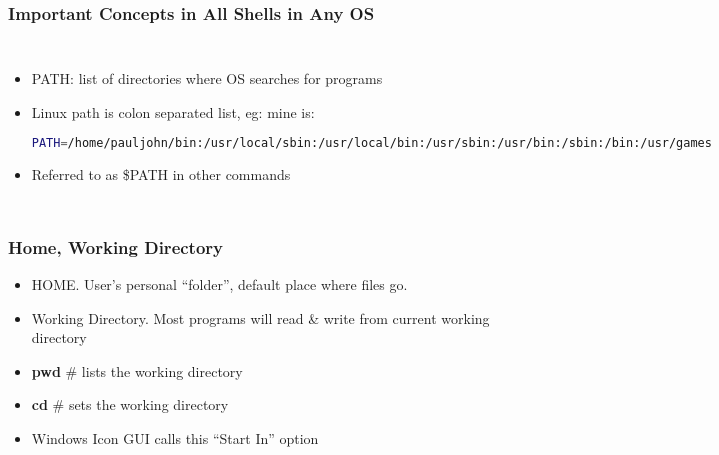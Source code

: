 \documentclass[English]{beamer}
\begin{document}
\begin{frame}[containsverbatim]
  \frametitle{Important Concepts in All Shells in Any OS}
  \begin{columns}
    \column{5cm}
    \begin{itemize}
    \item PATH: list of directories where OS searches for programs
   
    \item Linux path is colon separated list, eg: mine is:

\begin{lstlisting}[basicstyle={\small},breaklines=true,language=bash]
PATH=/home/pauljohn/bin:/usr/local/sbin:/usr/local/bin:/usr/sbin:/usr/bin:/sbin:/bin:/usr/games
\end{lstlisting}  
     \item Referred to as \$PATH in other commands

\end{itemize} 
\column{6cm}
 \begin{itemize}
    \item In Windows, the semicolon is a separator, slashes backwards
\begin{lstlisting}[basicstyle={\small},breaklines=true,language=bash]
PATH=C:\Windows;C:\Windows\system32;C:\Program Files\Mozilla Firefox;
\end{lstlisting}   
\item Referred to in other commands as \%PATH\%

  \end{itemize} 
 
\end{columns}
\end{frame}


\begin{frame}[containsverbatim]
  \frametitle{Home, Working Directory}
\begin{itemize}
      \item HOME. User's personal ``folder'', default place where
        files go.
      \item Working Directory.  Most programs will read \& write from
        current working directory
      \item \textbf{pwd} \# lists the working directory
      \item \textbf{cd} \# sets the working directory
      \item Windows Icon GUI calls this ``Start In'' option
    \end{itemize}
\end{frame}
\end{document}
